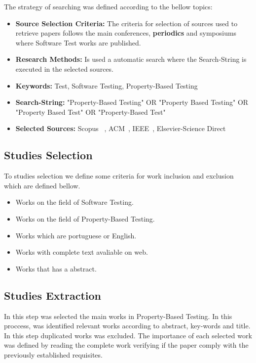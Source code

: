 		The strategy of searching was defined according to the bellow topics:
		\begin{itemize}
			\item \textbf{Source Selection Criteria:} The criteria for selection of sources used to retrieve papers follows the main conferences, \textbf{periodics} and symposiums where Software Test works are published. 
			\item \textbf{Research Methods:} Is used a automatic search where the Search-String is executed in the selected sources.
			\item \textbf{Keywords:} Test, Software Testing, Property-Based Testing
			\item \textbf{Search-String:} "Property-Based Testing" OR "Property Based Testing" OR "Property Based Test" OR "Property-Based Test" 
			\item \textbf{Selected Sources:} Scopus ~\cite{scopus}, ACM~\cite{acm}, IEEE~\cite{ieee}, Elsevier-Science Direct~\cite{esd}
		\end{itemize}

	\subsection{Studies Selection}
		
		To studies selection we define some criteria for work inclusion and exclusion which are defined bellow.

		\begin{itemize}
			\item Works on the field of Software Testing.
			\item Works on the field of Property-Based Testing.
			\item Works which are portuguese or English.
			\item Works with complete text avaliable on web.
			\item Works that has a abstract.
		\end{itemize} 


	\subsection{Studies Extraction}

		In this step was selected the main works in Property-Based Testing. In this proccess, was identified relevant works according to abstract, key-words and title. In this step duplicated works was excluded. The importance of each selected work was defined by reading the complete work verifying if the paper comply with the previously established requisites.

